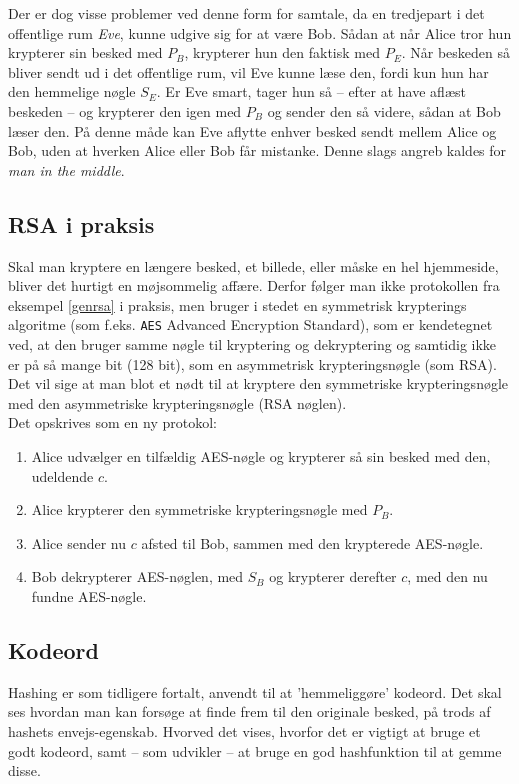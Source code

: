Der er dog visse problemer ved denne form for samtale, da en tredjepart i det offentlige rum \emph{Eve}, kunne udgive sig for at være Bob.
Sådan at når Alice tror hun krypterer sin besked med \(P_B\), krypterer hun den faktisk med \(P_E\).
Når beskeden så bliver sendt ud i det offentlige rum, vil Eve kunne læse den, fordi kun hun har den hemmelige nøgle \(S_E\).
Er Eve smart, tager hun så -- efter at have aflæst beskeden -- og krypterer den igen med \(P_B\) og sender den så videre, sådan at Bob læser den.
På denne måde kan Eve aflytte enhver besked sendt mellem Alice og Bob, uden at hverken Alice eller Bob får mistanke.
Denne slags angreb kaldes for \emph{man in the middle}. \cite{ytmitm}


\subsection{RSA i praksis}
Skal man kryptere en længere besked, et billede, eller måske en hel hjemmeside, bliver det hurtigt en møjsommelig affære.
Derfor følger man ikke protokollen fra eksempel \ref{genrsa} i praksis, men bruger i stedet en symmetrisk krypterings algoritme (som f.eks. \texttt{AES} Advanced Encryption Standard), som er kendetegnet ved, at den bruger samme nøgle til kryptering og dekryptering og samtidig ikke er på så mange bit (128 bit), som en asymmetrisk krypteringsnøgle (som RSA). \cite{algoritmer}
Det vil sige at man blot et nødt til at kryptere den symmetriske krypteringsnøgle med den asymmetriske krypteringsnøgle (RSA nøglen). \cite[112]{krypto}\\
Det opskrives som en ny protokol:

\begin{enumerate}
    \item Alice udvælger en tilfældig AES-nøgle og krypterer så sin besked med den, udeldende \(c\).
    \item Alice krypterer den symmetriske krypteringsnøgle med \(P_B\).
    \item Alice sender nu \(c\) afsted til Bob, sammen med den krypterede AES-nøgle.
    \item Bob dekrypterer AES-nøglen, med \(S_B\) og krypterer derefter \(c\), med den nu fundne AES-nøgle.
\end{enumerate}




\subsection{Kodeord}\label{kodeord}
Hashing er som tidligere fortalt, anvendt til at 'hemmeliggøre' kodeord.
Det skal ses hvordan man kan forsøge at finde frem til den originale besked, på trods af hashets envejs-egenskab.
Hvorved det vises, hvorfor det er vigtigt at bruge et godt kodeord, samt -- som udvikler -- at bruge en god hashfunktion til at gemme disse.


